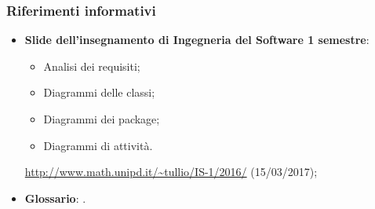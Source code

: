 \documentclass[../AnalisiDeiRequisiti.tex]{subfiles}
\begin{document}
			\subsubsection{Riferimenti informativi}	
				\begin{itemize}
					\item \textbf{Slide dell'insegnamento di Ingegneria del Software
					1 semestre}:
						\begin{itemize}
							\item Analisi dei requisiti;
							\item Diagrammi delle classi;
							\item Diagrammi dei package;
							\item Diagrammi di attività.
						\end{itemize}
						\url{http://www.math.unipd.it/~tullio/IS-1/2016/} (15/03/2017);
					\item \textbf{Glossario}: \glossariov.
				\end{itemize}
\end{document}
